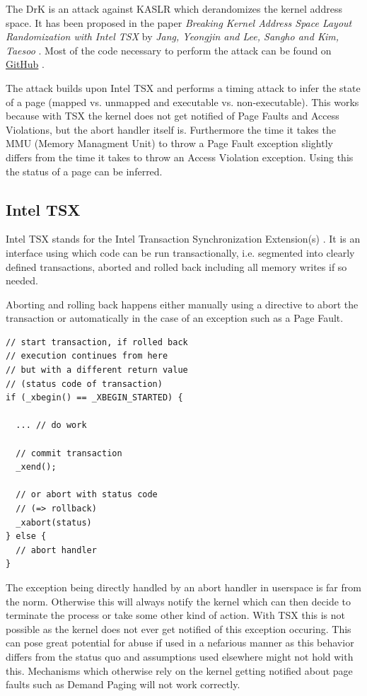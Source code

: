 The DrK is an attack against KASLR which derandomizes the kernel address space.
It has been proposed in the paper \textit{Breaking Kernel Address Space Layout Randomization with Intel TSX} by \textit{Jang, Yeongjin and Lee, Sangho and Kim, Taesoo} \cite{drk}.
Most of the code necessary to perform the attack can be found on \href{https://github.com/sslab-gatech/DrK}{GitHub} \cite{drk-attack-proof-of-concept-github}.

The attack builds upon Intel TSX and performs a timing attack to infer the state of a page (mapped vs. unmapped and executable vs. non-executable).
This works because with TSX the kernel does not get notified of Page Faults and Access Violations, but the abort handler itself is.
Furthermore the time it takes the MMU (Memory Managment Unit) to throw a Page Fault exception slightly differs from the time it takes to throw an Access Violation exception.
Using this the status of a page can be inferred.

\subsection{Intel TSX}

Intel TSX stands for the Intel Transaction Synchronization Extension(s) \cite{intel-tsx-overview}.
It is an interface using which code can be run transactionally, i.e. segmented into clearly defined transactions, aborted and rolled back including all memory writes if so needed.

Aborting and rolling back happens either manually using a directive to abort the transaction or automatically in the case of an exception such as a Page Fault.

\begin{lstlisting}
// start transaction, if rolled back
// execution continues from here
// but with a different return value
// (status code of transaction)
if (_xbegin() == _XBEGIN_STARTED) {

  ... // do work

  // commit transaction
  _xend();

  // or abort with status code
  // (=> rollback)
  _xabort(status)
} else {
  // abort handler
}
\end{lstlisting}

The exception being directly handled by an abort handler in userspace is far from the norm. Otherwise this will always notify the kernel which can then decide to terminate the process or take some other kind of action.
With TSX this is not possible as the kernel does not ever get notified of this exception occuring.
This can pose great potential for abuse if used in a nefarious manner as this behavior differs from the status quo and assumptions used elsewhere might not hold with this.
Mechanisms which otherwise rely on the kernel getting notified about page faults such as Demand Paging will not work correctly.

